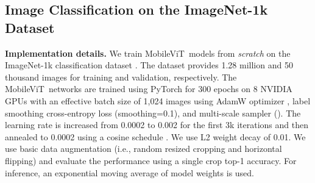 \documentclass[preprint]{article} \usepackage{iclr2022_conference,times}
\newcommand{\arch}{MobileViT}
\begin{document}
\subsection{Image Classification on the ImageNet-1k Dataset}
\label{ssec:imagenet_results}

\textbf{Implementation details.} We train \arch~models from \emph{scratch} on the ImageNet-1k classification dataset \citep{russakovsky2015imagenet}. The dataset provides 1.28 million  and 50 thousand images for training and validation, respectively. The \arch~networks are trained using PyTorch for 300 epochs on 8 NVIDIA GPUs with an effective batch size of 1,024 images using AdamW optimizer \citep{loshchilov2017decoupled}, label smoothing cross-entropy loss (smoothing=0.1), and multi-scale sampler (). The learning rate is increased from 0.0002 to 0.002 for the first 3k iterations and then annealed to 0.0002 using a cosine schedule \citep{loshchilov2016sgdr}. We use L2 weight decay of 0.01. We use basic data augmentation (i.e., random resized cropping and horizontal flipping) and evaluate the performance using a single crop top-1 accuracy. For inference, an exponential moving average of model weights is used.
\end{document}
